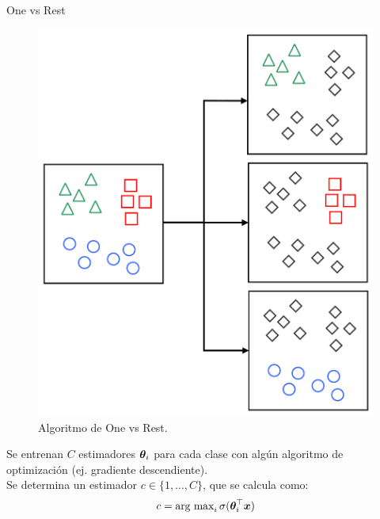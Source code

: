 \documentclass[10pt]{beamer}
\begin{document}
\begin{frame}{One vs Rest}
  \noindent\begin{minipage}{0.5\textwidth}
    \begin{figure}[H]
      \centering
      \includegraphics[width=\textwidth]{Images/one-vs-rest.pdf}
      \caption[Algoritmo de One vs Rest]{Algoritmo de One vs Rest.}
      \label{fig:ovr-algo}
    \end{figure}
  \end{minipage}%
  \hfill%
  \begin{minipage}{0.45\textwidth}
    Se entrenan $C$ estimadores ${\bm{\theta}}_i$ para cada clase con algún algoritmo de optimización (ej. gradiente descendiente). \\
    
    Se determina un estimador $c \in \{1, \ldots ,C\}$, que se calcula como:
    \begin{equation*}
      c = \text{arg max}_i \, \sigma({\bm{\theta}}_i^{\top} {\bm{x}})
    \end{equation*}
  \end{minipage}
\end{frame}
\end{document}
